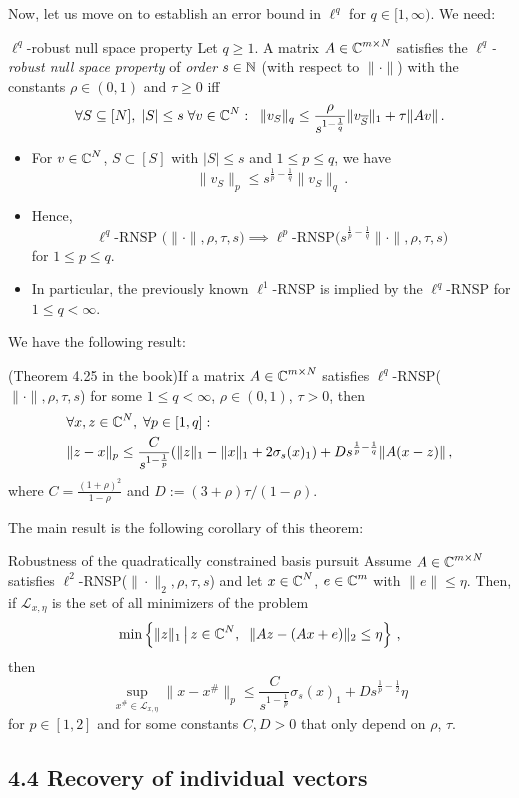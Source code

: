 \documentclass[a4paper]{article}
\begin{document}
    Now, let us move on to establish an error bound in \(\ell^q\) for \(q\in [1,\infty)\). We need:
    \begin{Def*}
 {$\ell^q$-robust null space property}{}
 Let \(q\ge 1\). A matrix \(A\in \operatorname{\mathbb C}^{m\times N}\) satisfies the \emph{$\ell^q$-robust null space property} of \emph{order} \(s\in \operatorname{\mathbb N}\) (with respect to \(\|\cdot\|\)) with the constants \(\rho\in (0,1)\) and \(\tau\ge0\) iff
 \[\forall S\subseteq [N],\;|S|\le s\;\forall v\in \operatorname{\mathbb C}^N:\;\;\|v_S\|_q\le \frac{\rho}{s^{1-\frac{1}{q}}}\|v_{\overline S}\|_1+\tau\|Av\|\,.\]
 \end{Def*}
 \begin{Bemerkung*}{}{}
     \begin{itemize}
		\item For \(v\in \operatorname{\mathbb C}^N \), \(S\subset [S]\) with \(|S|\le s\) and \(1\le p\le q\), we have 
		\[\|v_S\|_p\le s^{\frac{1}{p}-\frac{1}{q}}\|v_S\|_q\,.\]
		\item Hence, 
		\[
		\ell^q
		\text{-RNSP
		($\|\cdot\|,\rho,\tau,s$)}
		\implies \ell^p \text{-RNSP($s^{\frac{1}{p}-\frac{1}{q}}\|\cdot\|,\rho,\tau,s$)}
		\]
        for \(1\le p\le q\).
		\item In particular, the previously known \(\ell^1\)-RNSP is implied by the \(\ell^q\)-RNSP for \(1\le q<\infty\).
	\end{itemize}
 \end{Bemerkung*}    

 We have the following result:
 \begin{Satz*}
		{(Theorem 4.25 in the book)}{}If a matrix \(A\in \operatorname{\mathbb C}^{m\times N}\) satisfies \(\ell^q\)-RNSP($\|\cdot\|,\rho,\tau,s$) for some \(1\le q<\infty\), \(\rho\in (0,1)\), \(\tau>0\), then
		\begin{align*}
			&\forall x,z\in \operatorname{\mathbb C}^N,\;\forall p\in [1,q]:\\
			&\|z-x\|_p\le \frac{C}{s^{1-\frac{1}{p}}}(\|z\|_1-\|x\|_1+2\sigma_s(x)_1)+Ds^{\frac{1}{p}-\frac{1}{q}}\|A(x-z)\|\,,\\
		\end{align*}
		where \(C=\frac{(1+\rho)^2}{1-\rho}\) and \(D:=(3+\rho)\tau/(1-\rho)\).
	\end{Satz*}

   The main result is the following corollary of this theorem:
   \begin{Kor}
		{Robustness of the quadratically constrained basis pursuit}{}
		Assume \(A\in \operatorname{\mathbb C}^{m\times N }\) satisfies \(\ell^2 \)-RNSP($\|\cdot\|_2,\rho,\tau, s$) and let \(x\in \operatorname{\mathbb C}^N\), \(e\in \operatorname{\mathbb C}^m\) with \(\|e\|\le \eta\). Then, if \(\mathcal L_{x,\eta}\) is the set of all minimizers of the problem
		\[\min\left\{\|z\|_1\,\big|\,z\in \operatorname{\mathbb C}^N,\;\;\|Az-(Ax+e)\|_2\le \eta\right\}\,,\]
		then
		\[\sup_{x^{\#}\in \mathcal L_{x,\eta}}\|x-x^{\#}\|_p\le \frac{C}{s^{1-\frac{1}{p}}}\sigma_s(x)_1+Ds^{\frac{1}{p}-\frac{1}{2}}\eta\]
		for \(p\in [1,2]\) and for some constants \(C,D>0\) that only depend on \(\rho\), \(\tau\).
	\end{Kor} 


\subsection*{4.4  Recovery of individual vectors}
    
 
\end{document}
